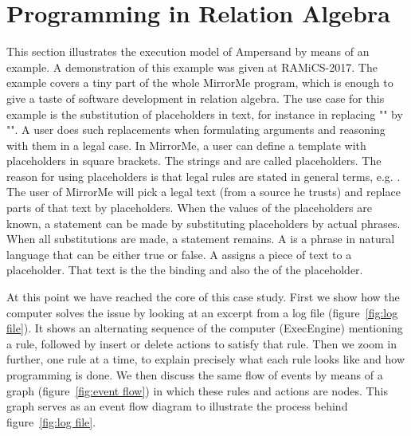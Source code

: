 \documentclass{elsarticle}
\begin{document}
\section{Programming in Relation Algebra}
\label{sct:Programming in RA}
	This section illustrates the execution model of Ampersand by means of an example.
	A demonstration of this example was given at RAMiCS-2017.
	The example covers a tiny part of the whole MirrorMe program,
	which is enough to give a taste of software development in relation algebra.
	The use case for this example is the substitution of placeholders in text,
	for instance in replacing "" by
        "".
	A user does such replacements when formulating arguments and reasoning with them in a legal case.
	In MirrorMe, a user can define a template with placeholders in square brackets.
	The strings \stmtText{[emp]} and \stmtText{[increase]} are called placeholders.
	The reason for using placeholders is that legal rules are stated in general terms, e.g.
	.
	The user of MirrorMe will pick a legal text (from a source he trusts) and replace parts of that text by placeholders.
	When the values of the placeholders are known, a statement can be made by substituting placeholders by actual phrases.
	When all substitutions are made, a statement remains.
	A  is a phrase in natural language that can be either true or false.
	A  assigns a piece of text to a placeholder.
	That text is the  the binding and
	also the  of the placeholder.
	
	At this point we have reached the core of this case study.
	First we show how the computer solves the issue by looking at an excerpt from a log file (figure~\ref{fig:log file}).
	It shows an alternating sequence of the computer (ExecEngine) mentioning a rule,
	followed by insert or delete actions to satisfy that rule.
	Then we zoom in further, one rule at a time, to explain precisely what each rule looks like and how programming is done.
	We then discuss the same flow of events by means of a graph (figure~\ref{fig:event flow}) in which these rules and actions are nodes.
	This graph serves as an event flow diagram to illustrate the process behind figure~\ref{fig:log file}.
\end{document}
